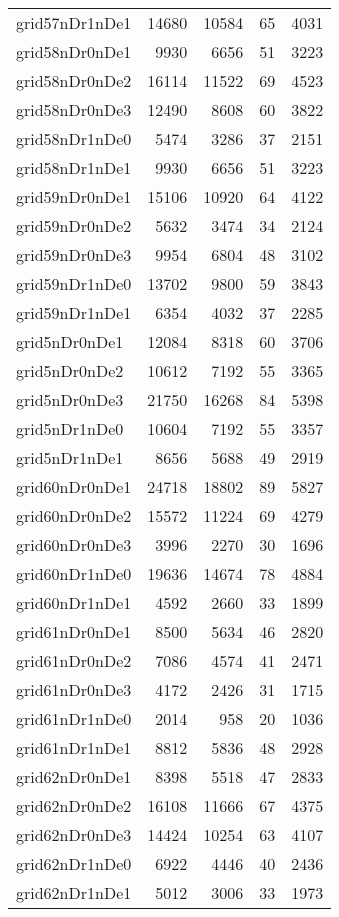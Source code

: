\begin{longtable}{lrrrr}
grid57nDr1nDe1 & 14680 & 10584 & 65 & 4031 \\
grid58nDr0nDe1 & 9930 & 6656 & 51 & 3223 \\
grid58nDr0nDe2 & 16114 & 11522 & 69 & 4523 \\
grid58nDr0nDe3 & 12490 & 8608 & 60 & 3822 \\
grid58nDr1nDe0 & 5474 & 3286 & 37 & 2151 \\
grid58nDr1nDe1 & 9930 & 6656 & 51 & 3223 \\
grid59nDr0nDe1 & 15106 & 10920 & 64 & 4122 \\
grid59nDr0nDe2 & 5632 & 3474 & 34 & 2124 \\
grid59nDr0nDe3 & 9954 & 6804 & 48 & 3102 \\
grid59nDr1nDe0 & 13702 & 9800 & 59 & 3843 \\
grid59nDr1nDe1 & 6354 & 4032 & 37 & 2285 \\
grid5nDr0nDe1 & 12084 & 8318 & 60 & 3706 \\
grid5nDr0nDe2 & 10612 & 7192 & 55 & 3365 \\
grid5nDr0nDe3 & 21750 & 16268 & 84 & 5398 \\
grid5nDr1nDe0 & 10604 & 7192 & 55 & 3357 \\
grid5nDr1nDe1 & 8656 & 5688 & 49 & 2919 \\
grid60nDr0nDe1 & 24718 & 18802 & 89 & 5827 \\
grid60nDr0nDe2 & 15572 & 11224 & 69 & 4279 \\
grid60nDr0nDe3 & 3996 & 2270 & 30 & 1696 \\
grid60nDr1nDe0 & 19636 & 14674 & 78 & 4884 \\
grid60nDr1nDe1 & 4592 & 2660 & 33 & 1899 \\
grid61nDr0nDe1 & 8500 & 5634 & 46 & 2820 \\
grid61nDr0nDe2 & 7086 & 4574 & 41 & 2471 \\
grid61nDr0nDe3 & 4172 & 2426 & 31 & 1715 \\
grid61nDr1nDe0 & 2014 & 958 & 20 & 1036 \\
grid61nDr1nDe1 & 8812 & 5836 & 48 & 2928 \\
grid62nDr0nDe1 & 8398 & 5518 & 47 & 2833 \\
grid62nDr0nDe2 & 16108 & 11666 & 67 & 4375 \\
grid62nDr0nDe3 & 14424 & 10254 & 63 & 4107 \\
grid62nDr1nDe0 & 6922 & 4446 & 40 & 2436 \\
grid62nDr1nDe1 & 5012 & 3006 & 33 & 1973 \\

\end{longtable}
